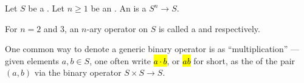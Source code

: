 \begin{definition} \label{definition:n_ary_operation_on_a_set}
    Let $S$ be a . Let $n \geq 1$ be an .
    An  is a  $S^n \to S$. 
    
    For $n=2$ and $3$, an $n$-ary operator on $S$ is called a  and  respectively.

    One common way to denote a generic binary operator is as ``multiplication'' --- given elements $a,b \in S$, one often write \hl{$a \cdot b$}, or \hl{$ab$} for short, as the  of the pair $(a,b)$ via the binary operator $S \times S \to S$.
\end{definition}